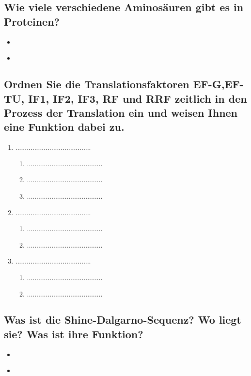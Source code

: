 \documentclass{article}
\begin{document}
\subsection*{Wie viele verschiedene Aminosäuren gibt es in
Proteinen?}
\begin{itemize}     \item  \end{itemize}
\begin{itemize}     \item  \end{itemize}


\subsection*{Ordnen Sie die
Translationsfaktoren EF-G,EF-TU, IF1, IF2, IF3, RF und RRF zeitlich in den Prozess der Translation ein und weisen Ihnen eine Funktion dabei zu. 
}
\begin{enumerate}
    \item  ........................................
    \begin{enumerate}
        \item ........................................
        \item ........................................
        \item ........................................
    \end{enumerate}
    \item ........................................
    \begin{enumerate}
        \item ........................................
        \item ........................................
    \end{enumerate}
    \item ........................................
    \begin{enumerate}
        \item ........................................
        \item ........................................
    \end{enumerate}
\end{enumerate}
\subsection*{Was ist  die Shine-Dalgarno-Sequenz?
Wo liegt sie? Was ist  ihre Funktion?}
\begin{itemize}     \item  \end{itemize}\begin{itemize}     \item  \end{itemize}
\end{document}
